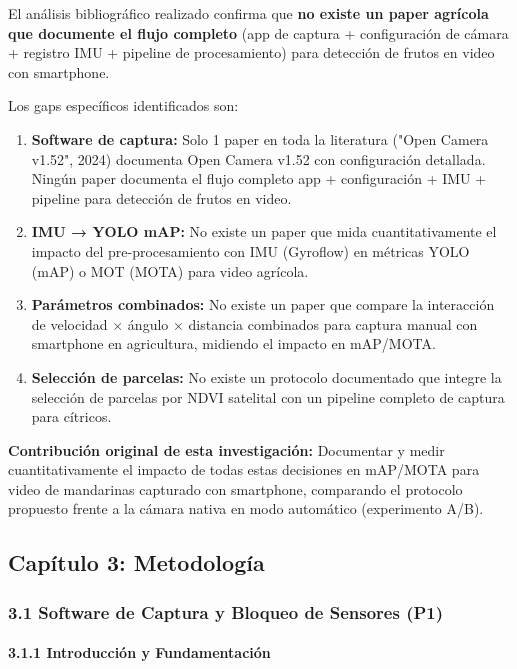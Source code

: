 El análisis bibliográfico realizado confirma que \textbf{no existe un paper agrícola que documente el flujo completo} (app de captura + configuración de cámara + registro IMU + pipeline de procesamiento) para detección de frutos en video con smartphone.


Los gaps específicos identificados son:


\begin{enumerate}
\item \textbf{Software de captura:} Solo 1 paper en toda la literatura ("Open Camera v1.52", 2024) documenta Open Camera v1.52 con configuración detallada. Ningún paper documenta el flujo completo app + configuración + IMU + pipeline para detección de frutos en video.
\item \textbf{IMU → YOLO mAP:} No existe un paper que mida cuantitativamente el impacto del pre-procesamiento con IMU (Gyroflow) en métricas YOLO (mAP) o MOT (MOTA) para video agrícola.
\item \textbf{Parámetros combinados:} No existe un paper que compare la interacción de velocidad × ángulo × distancia combinados para captura manual con smartphone en agricultura, midiendo el impacto en mAP/MOTA.
\item \textbf{Selección de parcelas:} No existe un protocolo documentado que integre la selección de parcelas por NDVI satelital con un pipeline completo de captura para cítricos.
\end{enumerate}

\textbf{Contribución original de esta investigación:} Documentar y medir cuantitativamente el impacto de todas estas decisiones en mAP/MOTA para video de mandarinas capturado con smartphone, comparando el protocolo propuesto frente a la cámara nativa en modo automático (experimento A/B).


\hline


\subsection{Capítulo 3: Metodología}


\subsubsection{3.1 Software de Captura y Bloqueo de Sensores (P1)}


\paragraph{3.1.1 Introducción y Fundamentación}


